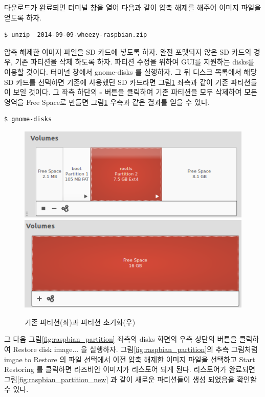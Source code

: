 \newpage

\noindent
다운로드가 완료되면 터미널 창을 열어 다음과 같이 압축 해제를 해주어 이미지 파일을 얻도록 하자.

\vspace{\baselineskip}
\begin{lstlisting}[language=ROS]
$ unzip  2014-09-09-wheezy-raspbian.zip
\end{lstlisting}

\noindent
압축 해제한 이미지 파일을 SD 카드에 넣도록 하자. 완전 포맷되지 않은 SD 카드의 경우, 기존 파티션을 삭제 하도록 하자. 파티션 수정을 위하여 GUI를 지원하는 disks를 이용할 것이다. 터미널 창에서 gnome-disks 를 실행하자. 그 뒤 디스크 목록에서 해당 SD 카드를 선택하면 기존에 사용했던 SD 카드라면 그림\ref{fig:partition_init1} 좌측과 같이 기존 파티션들이 보일 것이다. 그 좌측 하단의 \textbf{-} 버튼을 클릭하여 기존 파티션을 모두 삭제하여 모든 영역을 Free Space로 만들면 그림\ref{fig:partition_init1} 우측과 같은 결과를 얻을 수 있다.

\vspace{\baselineskip}
\begin{lstlisting}[language=ROS]
$ gnome-disks
\end{lstlisting}

\begin{figure}[h]
\centering
\includegraphics[width=0.49\columnwidth]{pictures/chapter3/odroid_partition1.png}
\includegraphics[width=0.48\columnwidth]{pictures/chapter3/odroid_partition2.png}
\caption{기존 파티션(좌)과 파티션 초기화(우)}
\label{fig:partition_init1}
\end{figure}

\noindent
그 다음 그림\ref{fig:raspbian_partition} 좌측의 disks 화면의 우측 상단의 버튼을 클릭하여 Restore disk image... 을 실행하자. 그림\ref{fig:raspbian_partition}의 추측 그림처럼 imgae to Restore 의 파일 선택에서 이전 압축 해제한 이미지 파일을 선택하고 Start Restoring 를 클릭하면 라즈비안 이미지가 리스토어 되게 된다. 리스토어가 완료되면 그림\ref{fig:raspbian_partition_new} 과 같이 새로운 파티션들이 생성 되었음을 확인할 수 있다.

